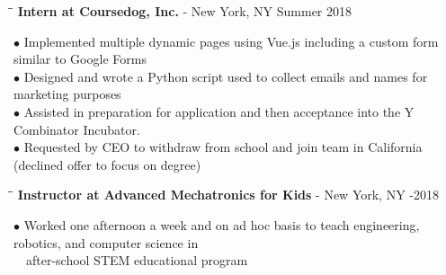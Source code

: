 \documentclass{res}
\begin{document}
\begin{resume}
    
   \begin{tabbing}
   \hspace{2.3in}\= \hspace{3.8in}\= \kill
    {\bf Intern at Coursedog, Inc.} - New York, NY   \>  \>Summer 2018
   \end{tabbing}\vspace{-20pt}
    $\bullet$ Implemented multiple dynamic pages using Vue.js including a custom form similar to Google Forms\\
    $\bullet$ Designed and wrote a Python script used to collect emails and names for marketing purposes\\
    $\bullet$ Assisted in preparation for application and then acceptance into the Y Combinator Incubator.\\
    $\bullet$ Requested by CEO to withdraw from school and join team in California (declined offer to focus on degree)
   \vspace{-15pt}
   \begin{tabbing}
   \hspace{2.3in}\= \hspace{4in}\= \kill
   {\bf Instructor at Advanced Mechatronics for Kids} - New York, NY   \>  -2018
   \end{tabbing}\vspace{-20pt}
    $\bullet$ Worked one afternoon a week and on ad hoc basis to teach engineering, robotics, and computer
	science in\\$~~~$ after-school STEM educational program



\vspace{-0.1in}

\end{resume}
\end{document}
